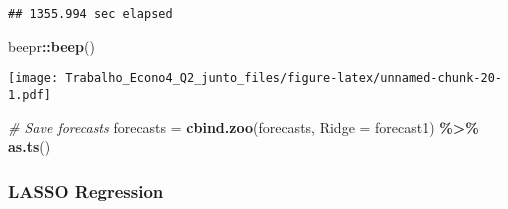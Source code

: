 \documentclass[
]{article}
\newenvironment{Shaded}{\begin{snugshade}}{\end{snugshade}}
\newcommand{\AttributeTok}[1]{\textcolor[rgb]{0.13,0.29,0.53}{#1}}
\newcommand{\CommentTok}[1]{\textcolor[rgb]{0.56,0.35,0.01}{\textit{#1}}}
\newcommand{\FunctionTok}[1]{\textcolor[rgb]{0.13,0.29,0.53}{\textbf{#1}}}
\newcommand{\NormalTok}[1]{#1}
\newcommand{\OtherTok}[1]{\textcolor[rgb]{0.56,0.35,0.01}{#1}}
\newcommand{\SpecialCharTok}[1]{\textcolor[rgb]{0.81,0.36,0.00}{\textbf{#1}}}
\begin{document}
\begin{verbatim}
## 1355.994 sec elapsed
\end{verbatim}

\begin{Shaded}
\begin{Highlighting}[]
\NormalTok{beepr}\SpecialCharTok{::}\FunctionTok{beep}\NormalTok{()}
\end{Highlighting}
\end{Shaded}

\texttt{[image: Trabalho\_Econo4\_Q2\_junto\_files/figure-latex/unnamed-chunk-20-1.pdf]}

\begin{Shaded}
\begin{Highlighting}[]
\CommentTok{\# Save forecasts}
\NormalTok{forecasts }\OtherTok{=} \FunctionTok{cbind.zoo}\NormalTok{(forecasts, }\AttributeTok{Ridge =}\NormalTok{ forecast1) }\SpecialCharTok{\%\textgreater{}\%}
    \FunctionTok{as.ts}\NormalTok{()}
\end{Highlighting}
\end{Shaded}

\hypertarget{lasso-regression}{%
\subsubsection{LASSO Regression}\label{lasso-regression}}
\end{document}
